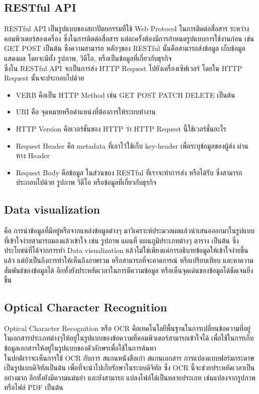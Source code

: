 \documentclass[12pt,oneside,openright,a4paper]{cpe-thai-project}
\begin{document}
\subsection{RESTful API}
\hspace*{1cm}RESTful API เป็นรูปแบบของสถาปัตยกรรมที่ใช้ Web Protocol ในการติดต่อสื่อสาร ระหว่างคอมพิวเตอร์สองเครื่อง ซึ่งในการติดต่อสื่อสาร แต่ละครั้งต้องมีการกำหนดรูปแบบการใช้งานก่อน เช่น GET POST เป็นต้น ซึ่งความสามารถ หลักๆของ RESTful นั้นคือสามารถส่งข้อมูล เก็บข้อมูล แสดงผล โดยจะมีทั้ง รูปภาพ, วิดีโอ, หรือเป็นข้อมูลที่เกี่ยวกับธุรกิจ\\
\hspace*{1cm}ซึ่งใน RESTful API จะเป็นการส่ง HTTP Request ไปยังเครื่องเซิฟเวอร์ โดยใน HTTP Request นั้นจะประกอบไปด้วย\\
\begin{itemize}
  \item {VERB คือเป็น HTTP Method เช่น GET POST PATCH DELETE เป็นต้น}
  \item {URI คือ จุดหมายหรือตำแหน่งที่ต้องการให้ระบบทำงาน}
  \item {HTTP Version คือเวอร์ชั่นของ HTTP ว่า HTTP Request นี้ใช้เวอร์ชั่นอะไร}
  \item {Request Header คือ metadata ที่เอาไว้ใช้เก็บ key-header เพื่อระบุข้อมูลของผู้ส่ง ผ่านทาง Header}
  \item {Request Body คือข้อมูล ในส่วนของ RESTful ที่เราจะทำการส่ง หรือได้รับ ซึ่งสามารถประกอบไปด้วย รูปภาพ วิดีโอ หรือข้อมูลที่เกี่ยวกับธุรกิจ}  
\end{itemize}

\subsection{Data visualization}
\hspace*{1cm} คือ การนำข้อมูลที่มีอยู่หรือจากแหล่งข้อมูลต่างๆ มาวิเคราะห์ประมวลผลแล้วนำเสนอออกมาในรูปแบบที่เข้าใจง่ายสามารถมองแล้วเข้าใจ เช่น รูปภาพ แผนที่ แผนภูมิประเภทต่างๆ ตาราง เป็นต้น ซึ่งประโยชน์ที่ได้จากการทำ Data visualization แล้วไม่ใช่เพียงแค่การอธิบายข้อมูลให้เข้าใจง่ายขึ้นแล้ว แต่ยังเป็นถึงการทำให้เห็นถึงภาพรวม หรือสามารถที่จะคาดการณ์ หรือเปรียบเทียบ และหาความสัมพันธ์ของข้อมูลได้ อีกทั้งยังประหยัดเวลาในการตีความข้อมูล หรือเห็นจุดเด่นของข้อมูลได้ชัดเจนยิ่งขึ้น 

\subsection{Optical Character Recognition}
\hspace*{1cm} Optical Character Recognition หรือ OCR คือเทคโนโลยีพื้นฐานในการเปลี่ยนข้อความที่อยู่ในเอกสารประเภทต่างๆให้อยู่ในรูปแบบของข้อความที่คอมพิวเตอร์สามารถเข้าใจได้ เพื่อใช้ในการเก็บข้อมูลเอกสารให้อยู่ในรูปแบบของตัวอักษรเพื่อใช้ในการค้นหา \\
\hspace*{1cm} ในปกติเราจะเห็นการใช้ OCR กับการ สแกนหนังสือเก่า สแกนเอกสาร การแปลงแบบฟอร์มกระดาษเป็นรูปแบบดิจิทัลเป็นต้น เพื่อที่จะนำไปเก็บรักษาในระบบดิจิทัล ซึ่ง OCR นี้จะช่วยประหยัดเวลาเป็นอย่างมาก อีกทั้งยังมีความแม่นยำ และยังสามารถ แปลงไฟล์ได้เป็นหลายประเภท เช่นแปลงจากรูปภาพ หรือไฟล์ PDF เป็นต้น
\end{document}
